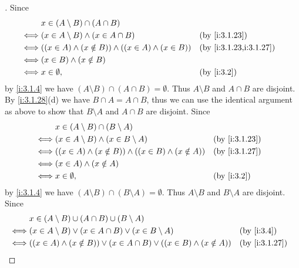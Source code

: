 \begin{proof}[]
  Since
  \begin{align*}
         & x \in (A \setminus B) \cap (A \cap B)                                                        \\
    \iff & (x \in A \setminus B) \land (x \in A \cap B)                     &  & \by{i:3.1.23}          \\
    \iff & ((x \in A) \land (x \notin B)) \land ((x \in A) \land (x \in B)) &  & \by{i:3.1.23,i:3.1.27} \\
    \iff & (x \in B) \land (x \notin B)                                                                 \\
    \iff & x \in \emptyset,                                                 &  & \by{i:3.2}
  \end{align*}
  by \cref{i:3.1.4} we have \((A \setminus B) \cap (A \cap B) = \emptyset\).
  Thus \(A \setminus B\) and \(A \cap B\) are disjoint.
  By \cref{i:3.1.28}(d) we have \(B \cap A = A \cap B\), thus we can use the identical argument as above to show that \(B \setminus A\) and \(A \cap B\) are disjoint.
  Since
  \begin{align*}
         & x \in (A \setminus B) \cap (B \setminus A)                                             \\
    \iff & (x \in A \setminus B) \land (x \in B \setminus A)                   &  & \by{i:3.1.23} \\
    \iff & ((x \in A) \land (x \notin B)) \land ((x \in B) \land (x \notin A)) &  & \by{i:3.1.27} \\
    \iff & (x \in A) \land (x \notin A)                                                           \\
    \iff & x \in \emptyset,                                                    &  & \by{i:3.2}
  \end{align*}
  by \cref{i:3.1.4} we have \((A \setminus B) \cap (B \setminus A) = \emptyset\).
  Thus \(A \setminus B\) and \(B \setminus A\) are disjoint.
  Since
  \begin{align*}
         & x \in (A \setminus B) \cup (A \cap B) \cup (B \setminus A)                                                             \\
    \iff & (x \in A \setminus B) \lor (x \in A \cap B) \lor (x \in B \setminus A)                              &  & \by{i:3.4}    \\
    \iff & ((x \in A) \land (x \notin B)) \lor (x \in A \cap B) \lor ((x \in B) \land (x \notin A))            &  & \by{i:3.1.27} \\

\end{align*}
\end{proof}
